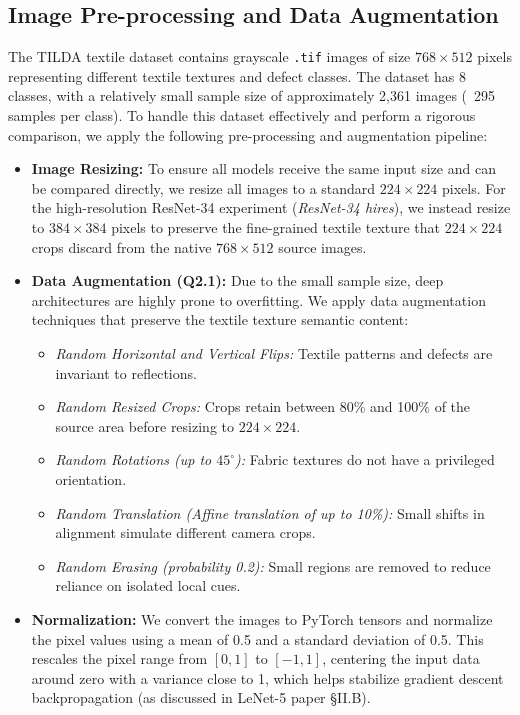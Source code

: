 \documentclass{name}
\begin{document}
\subsection{Image Pre-processing and Data Augmentation}
\label{sec:preproc}
The TILDA textile dataset contains grayscale \texttt{.tif} images of size $768 \times 512$ pixels representing different textile textures and defect classes. The dataset has 8 classes, with a relatively small sample size of approximately 2,361 images (~295 samples per class). To handle this dataset effectively and perform a rigorous comparison, we apply the following pre-processing and augmentation pipeline:
\begin{itemize}
    \item \textbf{Image Resizing:} To ensure all models receive the same input size and can be compared directly, we resize all images to a standard $224 \times 224$ pixels. For the high-resolution ResNet-34 experiment (\emph{ResNet-34 hires}), we instead resize to $384 \times 384$ pixels to preserve the fine-grained textile texture that $224\times224$ crops discard from the native $768\times512$ source images.
    \item \textbf{Data Augmentation (Q2.1):} Due to the small sample size, deep architectures are highly prone to overfitting. We apply data augmentation techniques that preserve the textile texture semantic content:
    \begin{itemize}
        \item \textit{Random Horizontal and Vertical Flips:} Textile patterns and defects are invariant to reflections.
        \item \textit{Random Resized Crops:} Crops retain between 80\% and 100\% of the source area before resizing to $224 \times 224$.
        \item \textit{Random Rotations (up to $45^\circ$):} Fabric textures do not have a privileged orientation.
        \item \textit{Random Translation (Affine translation of up to 10\%):} Small shifts in alignment simulate different camera crops.
        \item \textit{Random Erasing (probability 0.2):} Small regions are removed to reduce reliance on isolated local cues.
    \end{itemize}
    \item \textbf{Normalization:} We convert the images to PyTorch tensors and normalize the pixel values using a mean of 0.5 and a standard deviation of 0.5. This rescales the pixel range from $[0, 1]$ to $[-1, 1]$, centering the input data around zero with a variance close to 1, which helps stabilize gradient descent backpropagation (as discussed in LeNet-5 paper \S II.B).
\end{itemize}
\end{document}
